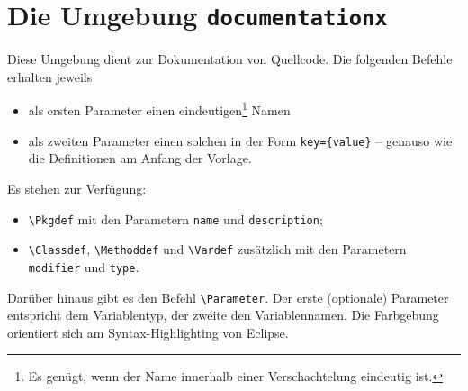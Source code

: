 





		\section{Die Umgebung \texttt{documentationx}}
			Diese Umgebung dient zur Dokumentation von Quellcode.
			Die folgenden Befehle erhalten jeweils
			\begin{itemize}
				\item als ersten Parameter einen eindeutigen\footnote{Es genügt, wenn der Name innerhalb einer Verschachtelung eindeutig ist.} Namen
				\item als zweiten Parameter einen solchen in der Form \verb|key={value}| -- genauso wie die Definitionen am Anfang der Vorlage.
			\end{itemize}
			Es stehen zur Verfügung:

			\begin{itemize}
				\item \verb|\Pkgdef| mit den Parametern \texttt{name} und \texttt{description};
				\item \verb|\Classdef|, \verb|\Methoddef| und \verb|\Vardef| zusätzlich mit den Parametern \texttt{modifier} und \texttt{type}.
			\end{itemize}
			Darüber hinaus gibt es den Befehl \verb|\Parameter|. Der erste (optionale) Parameter entspricht dem Variablentyp, der zweite den Variablennamen.
			Die Farbgebung orientiert sich am Syntax-Highlighting von Eclipse.

